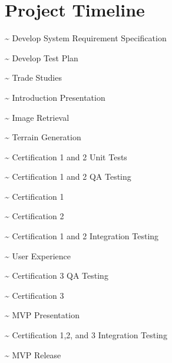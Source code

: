 \documentclass[letterpaper,10pt,english,openany,oneside]{sphinxmanual}
\let\sphinxpxdimen\pdfpxdimen\else\newdimen\sphinxpxdimen
\begin{document}
\section{Project Timeline}
\label{\detokenize{test_plan/project_timeline:project-timeline}}\label{\detokenize{test_plan/project_timeline::doc}}
\noindent\sphinxincludegraphics[width=630\sphinxpxdimen]{{project_plan}.png}

\pagebreak


\textasciitilde{}  Develop System Requirement Specification

\textasciitilde{}  Develop Test Plan

\textasciitilde{}  Trade Studies

\textasciitilde{}  Introduction Presentation

\textasciitilde{}  Image Retrieval

\textasciitilde{}  Terrain Generation

\textasciitilde{}  Certification 1 and 2 Unit Tests

\textasciitilde{}  Certification 1 and 2 QA Testing

\textasciitilde{}  Certification 1

\textasciitilde{}  Certification 2

\textasciitilde{}  Certification 1 and 2 Integration Testing

\textasciitilde{}  User Experience

\textasciitilde{}  Certification 3 QA Testing

\textasciitilde{}  Certification 3

\textasciitilde{}  MVP Presentation

\textasciitilde{}  Certification 1,2, and 3 Integration Testing

\textasciitilde{}  MVP Release
\end{document}
